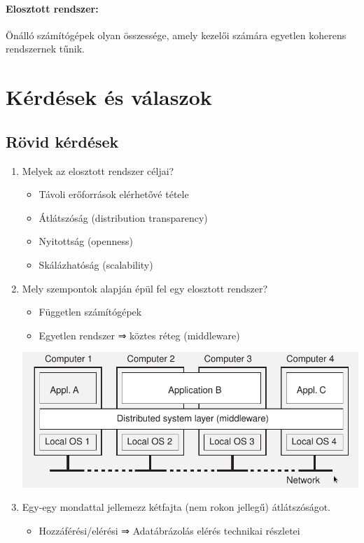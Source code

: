 \documentclass[twoside, a4paper, 12pt]{article}
\begin{document}
    \paragraph{Elosztott rendszer:}
        Önálló számítógépek olyan összessége, amely kezelői számára egyetlen
        koherens rendszernek tűnik.
\section{Kérdések és válaszok}
\subsection{Rövid kérdések}
\begin{enumerate}
    \item Melyek az elosztott rendszer céljai?
        \begin{itemize}
            \item Távoli erőforrások elérhetővé tétele
            \item Átlátszóság (distribution transparency)
            \item Nyitottság (openness)
            \item Skálázhatóság (scalability)
        \end{itemize}
    \item Mely szempontok alapján épül fel egy elosztott rendszer?
        \begin{itemize}
            \item Független számítógépek
            \item Egyetlen rendszer ⇒ köztes réteg (middleware)
        \end{itemize}
        \includegraphics[scale=0.5]{images/ElosztottRendszer.png}
    \item Egy-egy mondattal jellemezz kétfajta (nem rokon jellegű)
        átlátszóságot.
        \begin{itemize}
            \item Hozzáférési/elérési ⇒ Adatábrázolás elérés technikai részletei

\end{itemize}
\end{enumerate}
\end{document}

